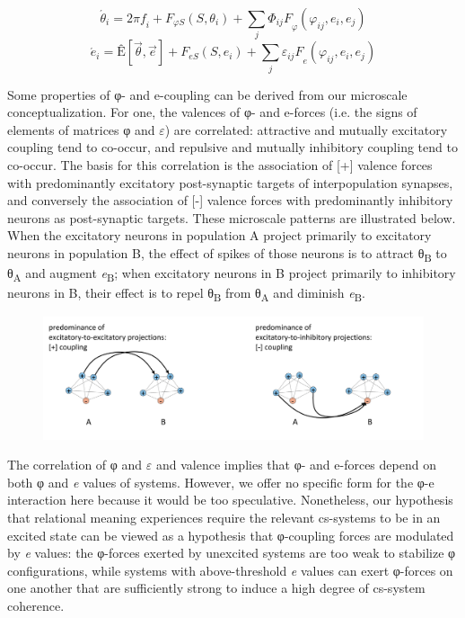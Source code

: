 \begin{equation*}
{\acute{{\theta} }}_{i}={2\mathit{\pi f}}_{i}+{F}_{\mathit{\varphi S}}\left(S,{\theta} _{i}\right)+\sum _{j}{{{\Phi} _{\mathit{ij}}F}_{\varphi} \left({\varphi} _{\mathit{ij}},{e}_{i},{e}_{j}\right)}
\end{equation*}
\begin{equation*}
{\acute{{e}}}_{i}=\text{Ê}\left[\overrightarrow{{\theta} },\overrightarrow{{e}}\right]+{F}_{\mathit{eS}}\left(S,{e}_{i}\right)+\sum _{j}{{{\varepsilon} _{\mathit{ij}}F}_{e}\left({\varphi} _{\mathit{ij}},{e}_{i},{e}_{j}\right)}
\end{equation*}

  Some properties of φ- and e-coupling can be derived from our microscale conceptualization. For one, the valences of φ- and e-forces (i.e. the signs of elements of matrices φ and $\varepsilon $) are correlated: attractive and mutually excitatory coupling tend to co-occur, and repulsive and mutually inhibitory coupling tend to co-occur. The basis for this correlation is the association of [+] valence forces with predominantly excitatory post-synaptic targets of interpopulation synapses, and conversely the association of [-] valence forces with predominantly inhibitory neurons as post-synaptic targets. These microscale patterns are illustrated below. When the excitatory neurons in population A project primarily to excitatory neurons in population B, the effect of spikes of those neurons is to attract θ\textsubscript{B} to θ\textsubscript{A} and augment \textit{e}\textsubscript{B}; when excitatory neurons in B project primarily to inhibitory neurons in B, their effect is to repel θ\textsubscript{B} from θ\textsubscript{A} and diminish \textit{e}\textsubscript{B}. 

  
\begin{figure}
\includegraphics[width=\textwidth]{figures/Tilsen-img21.png}
\caption{\missingcaption}
\label{fig:}
\end{figure}
 

  The correlation of φ and $\varepsilon $ and valence implies that φ- and e-forces depend on both φ and \textit{e} values of systems. However, we offer no specific form for the φ-e interaction here because it would be too speculative. Nonetheless, our hypothesis that relational meaning experiences require the relevant cs-systems to be in an excited state can be viewed as a hypothesis that φ-coupling forces are modulated by \textit{e} values: the φ-forces exerted by unexcited systems are too weak to stabilize φ configurations, while systems with above-threshold \textit{e} values can exert φ-forces on one another that are sufficiently strong to induce a high degree of cs-system coherence.

